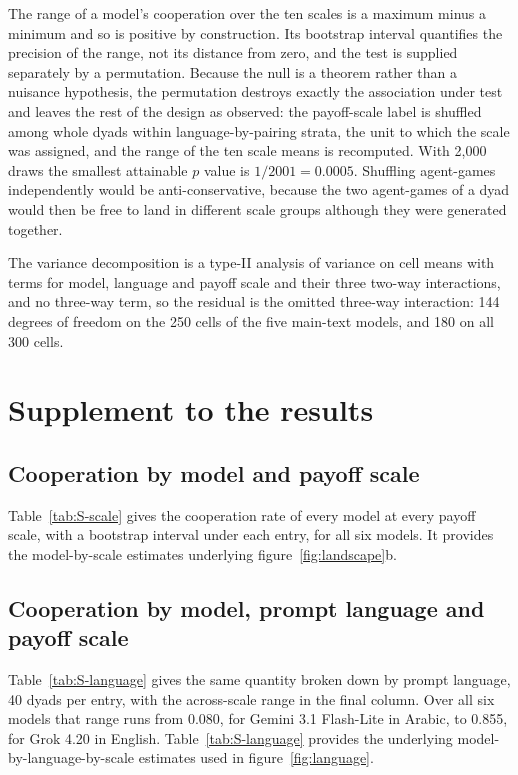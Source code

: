 \documentclass[openacc]{rsproca_new}
\begin{document}
The range of a model's cooperation over the ten scales is a maximum minus a
minimum and so is positive by construction. Its bootstrap interval quantifies
the precision of the range, not its distance from zero, and the test is
supplied separately by a permutation. Because the null is a theorem rather than
a nuisance hypothesis, the permutation destroys exactly the association under
test and leaves the rest of the design as observed: the payoff-scale label is
shuffled among whole dyads within language-by-pairing strata, the unit to which
the scale was assigned, and the range of the ten scale means is recomputed.
With 2{,}000 draws the smallest attainable $p$ value is $1/2001 = 0.0005$.
Shuffling agent-games independently would be anti-conservative, because the two
agent-games of a dyad would then be free to land in different scale groups
although they were generated together.

The variance decomposition is a type-II analysis of variance on cell means with
terms for model, language and payoff scale and their three two-way
interactions, and no three-way term, so the residual is the omitted three-way
interaction: 144 degrees of freedom on the 250 cells of the five main-text
models, and 180 on all 300 cells.


\section{Supplement to the results}\label{appendix:results}

\subsection{Cooperation by model and payoff scale}\label{appendix:by_scale}

Table~\ref{tab:S-scale} gives the cooperation rate of every model at every
payoff scale, with a bootstrap interval under each entry, for all six models.
It provides the model-by-scale estimates underlying figure~\ref{fig:landscape}b.

\subsection{Cooperation by model, prompt language and payoff scale}\label{appendix:by_language}

Table~\ref{tab:S-language} gives the same quantity broken down by prompt
language, 40 dyads per entry, with the across-scale range in the final column.
Over all six models that range runs from 0.080, for Gemini 3.1 Flash-Lite in
Arabic, to 0.855, for Grok 4.20 in English. Table~\ref{tab:S-language}
provides the underlying model-by-language-by-scale estimates used in
figure~\ref{fig:language}.
\end{document}
